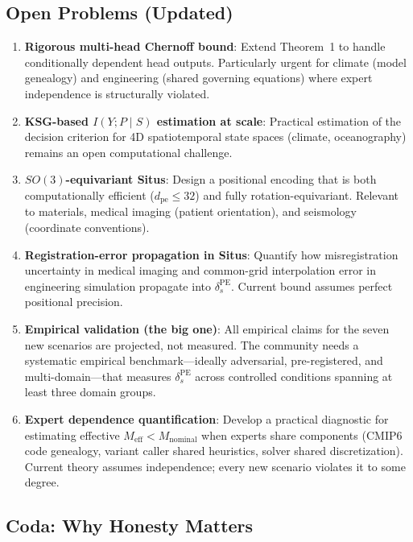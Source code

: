 \documentclass[12pt,a4paper]{article}
\begin{document}
\subsection{Open Problems (Updated)}

\begin{enumerate}[nosep]
\item \textbf{Rigorous multi-head Chernoff bound}: Extend Theorem~1 to handle conditionally dependent head outputs. Particularly urgent for climate (model genealogy) and engineering (shared governing equations) where expert independence is structurally violated.
\item \textbf{KSG-based $I(Y;P \mid S)$ estimation at scale}: Practical estimation of the decision criterion for 4D spatiotemporal state spaces (climate, oceanography) remains an open computational challenge.
\item \textbf{$SO(3)$-equivariant Situs}: Design a positional encoding that is both computationally efficient ($d_{\text{pe}} \leq 32$) and fully rotation-equivariant. Relevant to materials, medical imaging (patient orientation), and seismology (coordinate conventions).
\item \textbf{Registration-error propagation in Situs}: Quantify how misregistration uncertainty in medical imaging and common-grid interpolation error in engineering simulation propagate into $\delta_s^{\mathrm{PE}}$. Current bound assumes perfect positional precision.
\item \textbf{Empirical validation (the big one)}: All empirical claims for the seven new scenarios are projected, not measured. The community needs a systematic empirical benchmark—ideally adversarial, pre-registered, and multi-domain—that measures $\delta_s^{\mathrm{PE}}$ across controlled conditions spanning at least three domain groups.
\item \textbf{Expert dependence quantification}: Develop a practical diagnostic for estimating effective $M_{\text{eff}} < M_{\text{nominal}}$ when experts share components (CMIP6 code genealogy, variant caller shared heuristics, solver shared discretization). Current theory assumes independence; every new scenario violates it to some degree.
\end{enumerate}

\subsection{Coda: Why Honesty Matters}
\end{document}
